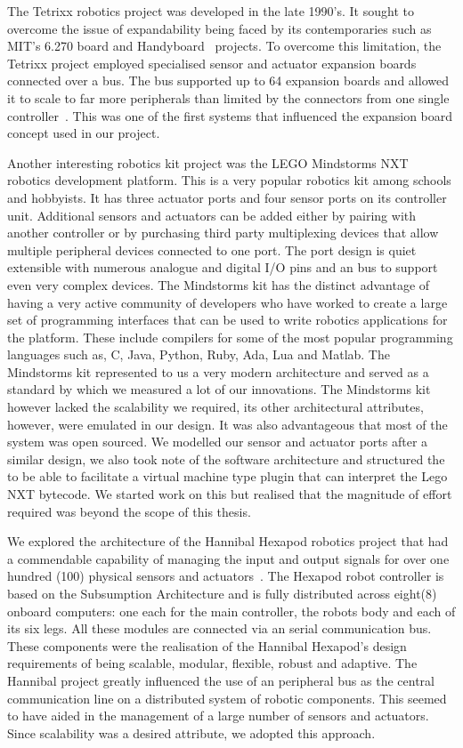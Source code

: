 The Tetrixx robotics project was developed in the late 1990's. It sought to overcome the issue of expandability being faced by its contemporaries such as MIT's 6.270 board and Handyboard~\parencite{handy} projects. To overcome this limitation, the Tetrixx project employed specialised sensor and actuator expansion boards connected over a bus. The bus supported up to 64 expansion boards and allowed it to scale to far more peripherals than limited by the connectors from one single controller~\parencite{tetrixx}. This was one of the first systems that influenced the expansion board concept used in our project.

Another interesting robotics kit project was the LEGO Mindstorms NXT robotics development platform. This is a very popular robotics kit among schools and hobbyists. It has three actuator ports and four sensor ports on its controller unit. Additional sensors and actuators can be added either by pairing with another controller or by purchasing third party multiplexing devices that allow multiple peripheral devices connected to one port. The port design is quiet extensible with numerous analogue and digital I/O pins and an \iic bus to support even very complex devices. The Mindstorms kit has the distinct advantage of having a very active community of developers who have worked to create a large set of programming interfaces that can be used to write robotics applications for the platform. These include compilers for some of the most popular programming languages such as, C, Java, Python, Ruby, Ada, Lua and Matlab. The Mindstorms kit represented to us a very modern architecture and served as a standard by which we measured a lot of our innovations. The Mindstorms kit however lacked the scalability we required, its other architectural attributes, however, were emulated in our design. It was also advantageous that most of the system was open sourced. We modelled our sensor and actuator ports after a similar design, we also took note of the software architecture and structured the \xten to be able to facilitate a virtual machine type plugin that can interpret the Lego NXT bytecode. We started work on this but realised that the magnitude of effort required was beyond the scope of this thesis.

We explored the architecture of the Hannibal Hexapod robotics project that had a commendable capability of managing the input and output signals for over one hundred (100) physical sensors and actuators~\parencite{hannibal}. The Hexapod robot controller is based on the Subsumption Architecture and is fully distributed across eight(8) onboard computers: one each for the main controller, the robots body and each of its six legs. All these modules are connected via an \iic serial communication bus. These components were the realisation of the Hannibal Hexapod's design requirements of being scalable, modular, flexible, robust and adaptive. The Hannibal project greatly influenced the use of an \iic peripheral bus as the central communication line on a distributed system of robotic components. This seemed to have aided in the management of a large number of sensors and actuators. Since scalability was a desired attribute, we adopted this approach.

